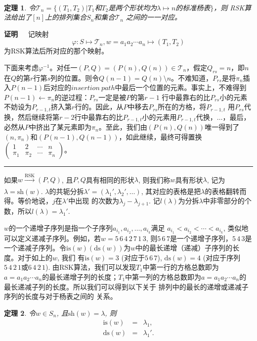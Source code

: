 \documentclass[a4paper,11pt,twoside]{book}
\newtheorem{thm}{定理}[section]
\def\qed{\nopagebreak\hfill{\rule{4pt}{7pt}}\medbreak}
\def\pf{{\bf 证明~~ }}
\begin{document}
\\
\\
\\
\\
\\
\\
\\
\\
\\
\\
\\
\begin{thm}
令$\mathcal{T}_{n}=\{(T_{1},
T_{2})|T_{1}$和$T_{2}$是两个形状均为$\lambda\mapsto
n$的标准杨表$\}$，则
RSK算法给出了$[n]$上的排列集合$S_n$和集合$\mathcal{T}_{n}$
之间的一一对应。
\end{thm}
\pf 记映射\[\varphi: S\mapsto \mathcal{T}_{n}, w=a_{1}a_{2}\cdots
a_{n}\mapsto (T_{1}, T_{2})\]为RSK算法后所对应的那个映射。

下面来考虑$\varphi^{-1}$。对任一$(P, Q)=(P(n), Q(n))\in
\mathcal{T}_{n}$，假定$Q_{rs}=n$，即$n$在$Q$的第$r$行第$s$列的位置。则令$Q(n-1)=Q(n)\setminus
n$。不难知道，$P_{rs}$是将$\pi_{n}$插入$P(n-1)$后对应的$insertion\
 path$中最后一个位置的元素。事实上，不难得到$P(n-1)\leftarrow \pi_{n}$的逆过程：$P_{rs}$一定是被$P$的第$r-1$
 行中最靠右的比$P_{rs}$小的元素不妨设为$P_{r-1, t}$挤入第$r$行的。因此，从$P$中移去$P_{rs}$所在的方格，将$P_{r-1, t}$
 用$P_{rs}$代换，然后继续将第$r-2$行中最靠右的比$P_{r-1, t}$小的元素用$P_{r-1, t}$代换，$\ldots$，最后，必然从$P$中挤出了某元素即为$\pi_{n}$。至此，我们由$(P(n), Q(n))$唯一得到了$(n,
\pi_{n})$和$(P(n-1),
Q(n-1))$，如此继续，最终可得置换$\left(\begin{array}{cccc}
1&2&\cdots&n\\\pi_1&\pi_2&\cdots&\pi_n\end{array}\right)$。\qed

如果$w \xrightarrow[]{\text{RSK}}(P,Q)$,
且$P,Q$具有相同的形状$\lambda$, 则我们称$w$具有形状$\lambda$,
记为$\lambda=\mathrm{sh}(w)$.
$\lambda$的共轭分拆$\lambda'=(\lambda_1',\lambda_2',\ldots)$,
其对应的表格是把$\lambda$的表格翻转而得。等价地说，$j$在$\lambda'$中出现
的次数为$\lambda_j-\lambda_{j+1}$.
记$l(\lambda)$为分拆$\lambda$中非零部分的个数，所以$l(\lambda)=\lambda_1'$.

$w$的一个递增子序列是指一个子序列$a_{i_1},a_{i_2},\ldots,a_{i_k}$满足
$a_{i_1}<a_{i_2}<\cdots<a_{i_k}$,
类似地可以定义递减子序列。例如，若$w=5\,6\,4\,2\,7\,1\,3$,
则$5\,6\,7$是一个递增子序列，$5\,4\,3$是一个递减子序列。令$\mathrm{is}(w)
 (\mathrm{ds}(w))$为$w$中的最长递增（递减）子序列的长度。对于如上的$w$, 我们
 有$\mathrm{is}(w) = 3$ (对应于$5\,6\,7$), $\mathrm{ds}(w) =
4$ (对应于序列$5\,4\,2\,1$或$6\,4\,2\,1$).
由RSK算法，我们可以发现$T_{1}$中第一行的方格总数即为$a=a_{1}a_{2}\cdots
a_{n}$的最长递增子列的长度；$T_{1}$中第一列的方格总数即为$a=a_{1}a_{2}\cdots
a_{n}$的最长递减子列的长度。所以我们可以得到以下关于
排列中的最长的递增或递减子序列的长度与对于杨表之间的
关系。
\begin{thm}
令$w \in S_n$, 且$\mathrm{sh}(w)=\lambda$, 则
\begin{eqnarray}
\mathrm{is}(w)&=&\lambda_1,\\
 \mathrm{ds}(w)&=&\lambda_1'.
\end{eqnarray}
\end{thm}
\end{document}
